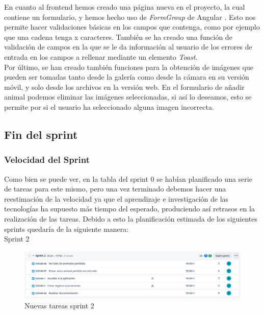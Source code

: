 En cuanto al frontend hemos creado una página nueva en el proyecto, la cual contiene un formulario, y hemos hecho uso de \textit{FormGroup} de Angular \cite{formgroup}. Esto nos permite hacer validaciones básicas en los campos que contenga, como por ejemplo que una cadena tenga x caracteres. También se ha creado una función de validación de campos en la que se le da información al usuario de los errores de entrada en los campos a rellenar mediante un elemento \textit{Toast}. \\

Por último, se han creado también funciones para la obtención de imágenes que pueden ser tomadas tanto desde la galería como desde la cámara en su versión móvil, y solo desde los archivos en la versión web. En el formulario de añadir animal podemos eliminar las imágenes seleccionadas, si así lo deseamos, esto se permite por si el usuario ha seleccionado alguna imagen incorrecta.\\

\subsection{Fin del sprint}

\subsubsection{Velocidad del Sprint}
Como bien se puede ver, en la tabla del sprint 0 se habían planificado una serie de tareas para este mismo, pero una vez terminado debemos hacer una reestimación de la velocidad ya que el aprendizaje e investigación de las tecnologías ha supuesto más tiempo del esperado, produciendo así retrasos en la realización de las tareas. Debido a esto la planificación estimada de los siguientes sprints quedaría de la siguiente manera: \\

Sprint 2 \\
\begin{figure}[H]
	\centering
	\includegraphics[width=1\linewidth]{newSprint2}
	\caption{Nuevas tareas sprint 2}
	\label{fig:newsprint2}
\end{figure}


